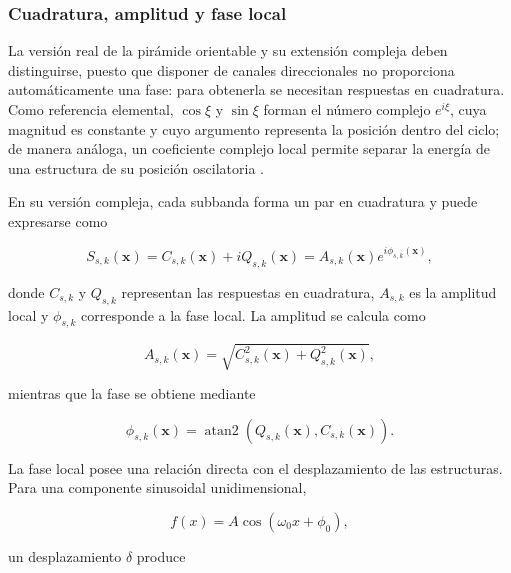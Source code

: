 \subsubsection{Cuadratura, amplitud y fase local}

La versión real de la pirámide orientable y su extensión compleja deben distinguirse, puesto que disponer de canales direccionales no proporciona automáticamente una fase: para obtenerla se necesitan respuestas en cuadratura. Como referencia elemental, $\cos\xi$ y $\sin\xi$ forman el número complejo $e^{i\xi}$, cuya magnitud es constante y cuyo argumento representa la posición dentro del ciclo; de manera análoga, un coeficiente complejo local permite separar la energía de una estructura de su posición oscilatoria \cite{wadhwa2014riesz}.

En su versión compleja, cada subbanda forma un par en cuadratura y puede expresarse como

\begin{equation}
    S_{s,k}(\mathbf{x})
    =
    C_{s,k}(\mathbf{x})
    +
    iQ_{s,k}(\mathbf{x})
    =
    A_{s,k}(\mathbf{x})
    e^{i\phi_{s,k}(\mathbf{x})},
    \label{eq:coeficiente_steerable_complejo}
\end{equation}

donde $C_{s,k}$ y $Q_{s,k}$ representan las respuestas en cuadratura, $A_{s,k}$ es la amplitud local y $\phi_{s,k}$ corresponde a la fase local. La amplitud se calcula como

\begin{equation}
    A_{s,k}(\mathbf{x})
    =
    \sqrt{
        C_{s,k}^2(\mathbf{x})
        +
        Q_{s,k}^2(\mathbf{x})
    },
    \label{eq:amplitud_steerable}
\end{equation}

mientras que la fase se obtiene mediante

\begin{equation}
    \phi_{s,k}(\mathbf{x})
    =
    \operatorname{atan2}
    \left(
        Q_{s,k}(\mathbf{x}),
        C_{s,k}(\mathbf{x})
    \right).
    \label{eq:fase_steerable}
\end{equation}

La fase local posee una relación directa con el desplazamiento de las estructuras. Para una componente sinusoidal unidimensional,

\begin{equation}
    f(x)=A\cos(\omega_0x+\phi_0),
\end{equation}

un desplazamiento $\delta$ produce

